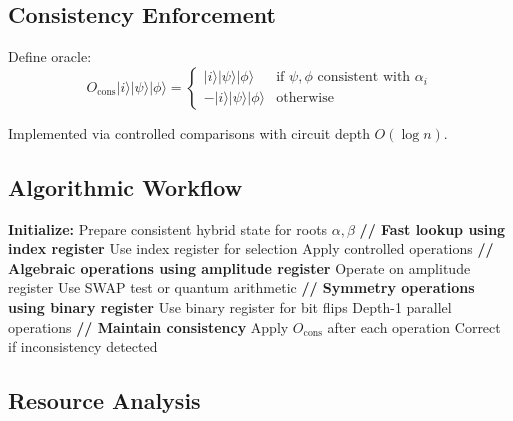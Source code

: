 \subsection{Consistency Enforcement}

\begin{proposition}
\label{prop:hybrid_consistency}
Define oracle:
\begin{equation}
O_{\text{cons}} |i\rangle |\psi\rangle |\phi\rangle = \begin{cases}
|i\rangle |\psi\rangle |\phi\rangle & \text{if } \psi, \phi \text{ consistent with } \alpha_i \\
-|i\rangle |\psi\rangle |\phi\rangle & \text{otherwise}
\end{cases}
\end{equation}

Implemented via controlled comparisons with circuit depth $O(\log n)$.
\end{proposition}

\subsection{Algorithmic Workflow}

\begin{algorithm}[H]
\caption{Hybrid Encoding Workflow for Root Operations}
\label{alg:hybrid_workflow}
\begin{algorithmic}[1]
\State \textbf{Initialize:} Prepare consistent hybrid state for roots $\alpha, \beta$
\State
\State \textbf{// Fast lookup using index register}
    \State Use index register for selection
    \State Apply controlled operations
\EndIf
\State
\State \textbf{// Algebraic operations using amplitude register}
    \State Operate on amplitude register
    \State Use SWAP test or quantum arithmetic
\EndIf
\State
\State \textbf{// Symmetry operations using binary register}
    \State Use binary register for bit flips
    \State Depth-1 parallel operations
\EndIf
\State
\State \textbf{// Maintain consistency}
\State Apply $O_{\text{cons}}$ after each operation
\State Correct if inconsistency detected
\end{algorithmic}
\end{algorithm}

\subsection{Resource Analysis}

